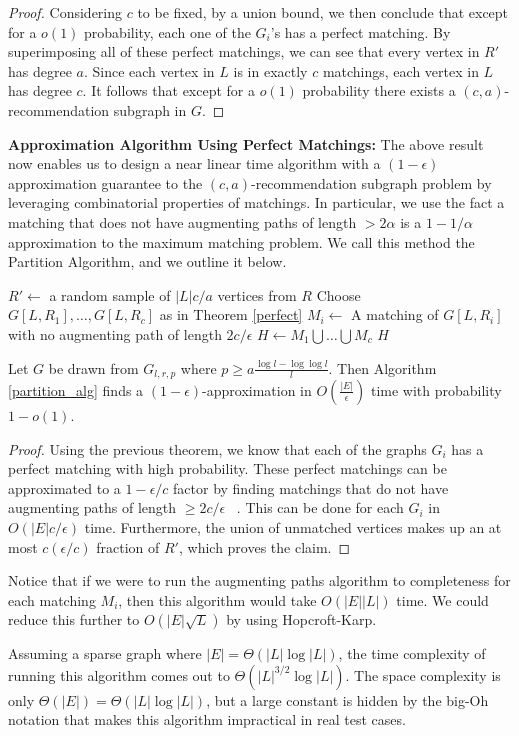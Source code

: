 \begin{proof}
Considering $c$ to be fixed, by a union bound, we then conclude that except
for a $o(1)$ probability, each one of the $G_i$'s has a perfect matching. By
superimposing all of these perfect matchings, we can see that every vertex in
$R'$ has degree $a$. Since each vertex in $L$ is in exactly $c$ matchings, each
vertex in $L$ has degree $c$. It follows that except for a $o(1)$ probability
there exists a $(c,a)$-recommendation subgraph in $G$.
\end{proof}

{\bf Approximation Algorithm Using Perfect Matchings:}
The above result now enables us to design a near linear time
algorithm with a $(1-\epsilon)$ approximation guarantee
to the $(c,a)$-recommendation subgraph problem by leveraging
combinatorial properties of matchings. In particular, we use
the fact a matching that does not have augmenting paths of
length $>2\alpha$ is a $1-1/\alpha$ approximation to the maximum
matching problem. We call this method the Partition Algorithm,
and we outline it below.

\begin{algorithm}[h]\label{partition_alg}
  \SetAlgoLined
  $R' \leftarrow$ a random sample of $|L|c/a$ vertices from $R$\;
  Choose $G[L,R_1],\ldots,G[L,R_c]$ as in Theorem \ref{perfect}\;
   {
    $M_i \leftarrow$ A matching of $G[L,R_i]$ with no augmenting path of length $2c/\epsilon$\;
  }
  $H \leftarrow M_1\bigcup\ldots \bigcup M_c$\;
  \Return $H$\;
  \caption{The partition algorithm}
\end{algorithm}

\begin{thm}
Let $G$ be drawn from $G_{l,r,p}$ where $p \geq a\frac{\log l - \log\log l}{l}$.
Then Algorithm \ref{partition_alg} finds a $(1-\epsilon)$-approximation
in $O(\frac{|E|}{\epsilon})$ time with probability $1-o(1)$.
\end{thm}
\begin{proof}
Using the previous theorem, we know that each of the graphs $G_i$ has a
perfect matching with high probability. These perfect matchings
can be approximated to a $1-\epsilon/c$ factor by finding matchings
that do not have augmenting paths of length $\geq 2c/\epsilon$
~\cite{LovaszPlummer1986}. This can be done for each $G_i$ in
$O(|E|c/\epsilon)$ time. Furthermore, the union of unmatched vertices
makes up an at most $c(\epsilon/c)$ fraction of $R'$, which proves the claim.
\end{proof}

Notice that if we were to run the augmenting paths algorithm to completeness
for each matching $M_i$, then this algorithm would take $O(|E||L|)$ time. We
could reduce this further to $O(|E|\sqrt{L})$ by using Hopcroft-Karp.
\cite{HopcroftKarp} \vs

Assuming
a sparse graph where $|E|=\Theta(|L|\log|L|)$, the time complexity of running
this algorithm comes out to $\Theta(|L|^{3/2}\log|L|)$.  The space complexity
is only $\Theta(|E|) = \Theta(|L|\log|L|)$, but a large constant is hidden by
the big-Oh notation that makes this algorithm impractical in real test cases. 
